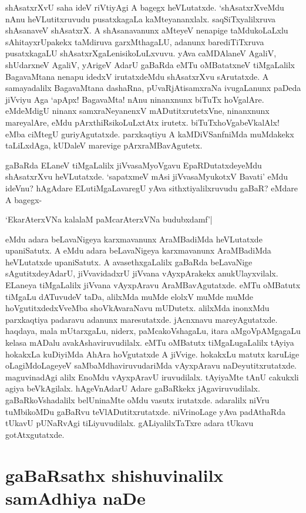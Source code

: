 shAsatxrXvU saha ideV riVtiyAgi A bagegx heVLutatxde. `shAsatxrXveMdu nAnu heVLutitxruvudu pusatxkagaLa kaMteyananxlalx. saqSiTxyalilxruva shAsanaveV shAsatxrX. A shAsanavanunx aMteyeV nenapige taMdukoLaLxlu sAhitayxrUpakekx taMdiruva garxMthagaLU, adanunx barediTiTxruva pusatxkagaLU shAsatxrXgaLenisikoLuLxvuvu. yAva caMDAlaneV AgaliV, shUdarxneV AgaliV, yArigeV AdarU gaBaRda eMTu oMBatatxneV tiMgaLalilx BagavaMtana nenapu idedxV irutatxdeMdu shAsatxrXvu sArutatxde. A samayadalilx BagavaMtana dashaRna, pUvaRjAtisamxraNa ivugaLanunx paDeda jiVviyu Aga `apApx! BagavaMta! nAnu ninanxnunx biTuTx hoVgalAre. eMdeMdigU ninanx samxraNeyanenxV mADutitxrutetxVne, ninanxnunx mareyalAre, eMdu pArxthiRsikoLuLxtAtx irutetx. biTuTxhoVgabeVkalAlx! eMba ciMtegU guriyAgutatxde. parxkaqtiyu A kaMDiVSanfniMda muMdakekx taLiLxdAga, kUDaleV marevige pArxraMBavAgutetx.

gaBaRda ELaneV tiMgaLalilx jiVvasaMyoVgavu EpaRDutatxdeyeMdu shAsatxrXvu heVLutatxde. `sapatxmeV mAsi jiVvasaMyukotxV Bavati'\label{85a} eMdu ideVnu? hAgAdare ELutiMgaLavaregU yAva sithxtiyalilxruvudu gaBaR? eMdare A bagegx-

\begin{shloka}
`EkarAterxVNa kalalaM paMcarAterxVNa budubxdamf'|\label{85}
\end{shloka}
eMdu adara beLavaNigeya karxmavanunx  AraMBadiMda heVLutatxde upaniSatutx. A eMdu adara beLavaNigeya karxmavanunx AraMBadiMda heVLutatxde upaniSatutx. A avasethxgaLalilx gaBaRda beLavaNige sAgutitxdeyAdarU, jiVvavidadxrU jiVvana vAyxpArakekx anukUlayxvilalx. ELaneya tiMgaLalilx jiVvana vAyxpAravu AraMBavAgutatxde. eMTu oMBatutx tiMgaLu dATuvudeV taDa, alilxMda muMde elolxV muMde muMde hoVgutitxdedxVveMba shoVkAvaraNavu mUDutetx. alilxMda inonxMdu parxkaqtiya padaravu adanunx maresutatxde. jAcnxnavu mareyAgutatxde. haqdaya, mala mUtarxgaLu, niderx, paMcakoVshagaLu, itara aMgoVpAMgagaLu kelasa mADalu avakAshaviruvudilalx. eMTu oMBatutx tiMgaLugaLalilx tAyiya hokakxLa kuDiyiMda AhAra hoVgutatxde A jiVvige. hokakxLu matutx karuLige oLagiMdoLageyeV saMbaMdhaviruvudariMda vAyxpAravu naDeyutitxrutatxde. maguvinadAgi alilx EnoMdu vAyxpAravU iruvudilalx. tAyiyaMte tAnU cakukxli agiya beVkAgilalx. hAgeVnAdarU Adare gaBaRkekx jAgaviruvudilalx. gaBaRkoVshadalilx belUninaMte oMdu vasutx irutatxde. adaralilx niVru tuMbikoMDu gaBaRvu teVlADutitxrutatxde. niVrinoLage yAva padAthaRda tUkavU pUNaRvAgi tiLiyuvudilalx. gALiyalilxTaTxre adara tUkavu gotAtxgutatxde.

\section*{gaBaRsathx shishuvinalilx samAdhiya naDe}


